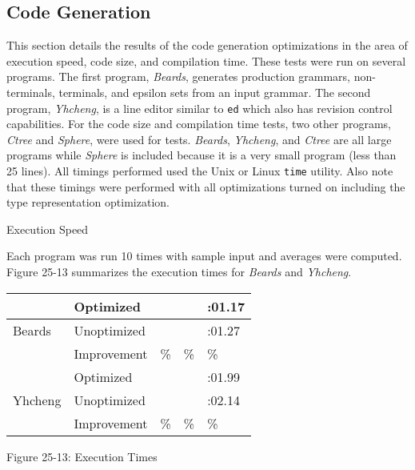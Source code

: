 \subsection{Code Generation}

This section details the results of the code generation optimizations
in the area of execution speed, code size, and compilation time. These
tests were run on several programs. The first program,
\textit{Beards}, generates production grammars, non-terminals,
terminals, and epsilon sets from an input grammar. The second program,
\textit{Yhcheng}, is a line editor similar to \texttt{ed} which also
has revision control capabilities. For the code size and compilation
time tests, two other programs, \textit{Ctree} and \textit{Sphere},
were used for tests. \textit{Beards}, \textit{Yhcheng}, and
\textit{Ctree} are all large programs while \textit{Sphere} is
included because it is a very small program (less than 25 lines).  All
timings performed used the Unix or Linux \texttt{time} utility.  Also
note that these timings were performed with all optimizations turned
on including the type representation optimization.

{\sffamily
Execution Speed}

Each program was run 10 times with sample input and averages were
computed. Figure 25-13 summarizes the execution times for
\textit{Beards} and \textit{Yhcheng}.

\begin{center}
\tabletail{}
\tablelasttail{}
\begin{supertabular}{|m{1.1212599in}|m{1.1212599in}|m{1.1212599in}|m{1.1212599in}|m{1.1212599in}|}
\hline
~
 &
 Optimized &
 &
 &
\raggedleft{}:01.17\\\hline
 Beards &
 Unoptimized &
 &
 &
\raggedleft{}:01.27\\\hline
~
 &
 Improvement &
\% &
\% &
\raggedleft{}\%\\\hline
~
 &
 Optimized &
 &
 &
\raggedleft{}:01.99\\\hline
 Yhcheng &
 Unoptimized &
 &
 &
\raggedleft{}:02.14\\\hline
~
 &
 Improvement &
\% &
\% &
\raggedleft{}\%\\\hline
\end{supertabular}
\end{center}
{\centering{}
Figure 25-13: Execution Times
\par}

